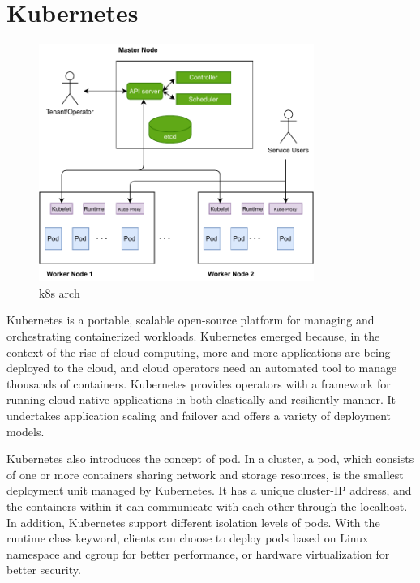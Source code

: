 \section{Kubernetes}
\begin{figure}[H]
    \centering
    \includegraphics[width=0.8\textwidth]{images/k8s_arch.pdf}
    \caption[k8s arch]{k8s arch}
    \label{fig:k8s_arch}
  \end{figure}

Kubernetes\cite*{k8s} is a portable, scalable open-source platform for managing and orchestrating containerized workloads. Kubernetes emerged because, in the context of the rise of cloud computing, more and more applications are being deployed to the cloud, 
and cloud operators need an automated tool to manage thousands of containers. Kubernetes provides operators with a framework for running cloud-native applications\cite*{KRATZKE20171} in both elastically and resiliently manner. 
It undertakes application scaling and failover and offers a variety of deployment models.

Kubernetes also introduces the concept of pod. In a cluster, a pod, which consists of one or more containers sharing network and storage resources, is the smallest deployment unit managed by Kubernetes. It has a unique cluster-IP address, and the containers within it 
can communicate with each other through the localhost. In addition, Kubernetes support different isolation levels of pods. With the runtime class keyword, clients can choose to deploy pods based on Linux namespace and cgroup for better performance, 
or hardware virtualization for better security\cite*{k8s_runtime_class}.


